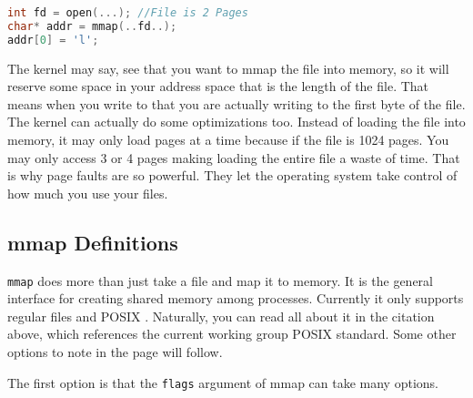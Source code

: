 \begin{lstlisting}[language=C]
int fd = open(...); //File is 2 Pages
char* addr = mmap(..fd..);
addr[0] = 'l';
\end{lstlisting}

The kernel may say, see that you want to mmap the file into memory, so it will reserve some space in your address space that is the length of the file.
That means when you write to  that you are actually writing to the first byte of the file.
The kernel can actually do some optimizations too.
Instead of loading the file into memory, it may only load pages at a time because if the file is 1024 pages.
You may only access 3 or 4 pages making loading the entire file a waste of time.
That is why page faults are so powerful.
They let the operating system take control of how much you use your files.

\subsection{mmap Definitions}

\texttt{mmap} does more than just take a file and map it to memory.
It is the general interface for creating shared memory among processes.
Currently it only supports regular files and POSIX  \cite{mmap_2018}.
Naturally, you can read all about it in the citation above, which references the current working group POSIX standard.
Some other options to note in the page will follow.

The first option is that the \texttt{flags} argument of mmap can take many options.


